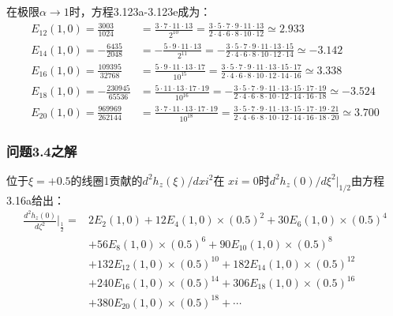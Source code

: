 在极限$\alpha\rightarrow 1$时，方程3.123a-3.123e成为：
\begin{subequations}
	\begin{align}
E_{12}(1,0)=\frac{3003}{1024}&=\frac{3\cdot7\cdot11\cdot13}{2^{10}}=\frac{3\cdot5\cdot7\cdot9\cdot11\cdot13}{2\cdot4\cdot6\cdot8\cdot10\cdot12}\simeq 2.933\\
E_{14}(1,0)=-\frac{6435}{2048}&=-\frac{5\cdot9\cdot11\cdot13}{2^{11}}=-\frac{3\cdot5\cdot7\cdot9\cdot11\cdot13\cdot15}{2\cdot4\cdot6\cdot8\cdot10\cdot12\cdot14}\simeq-3.142\\
E_{16}(1,0)=\frac{109395}{32768}&=\frac{5\cdot9\cdot11\cdot13\cdot17}{10^{15}}=\frac{3\cdot5\cdot7\cdot9\cdot11\cdot13\cdot15\cdot17} {2\cdot4\cdot6\cdot8\cdot10\cdot12\cdot14\cdot16}\simeq 3.338\\
E_{18}(1,0)=-\frac{230945}{65536}&=\frac{5\cdot11\cdot13\cdot17\cdot19}{10^{16}}=-\frac{3\cdot5\cdot7\cdot9\cdot11\cdot13\cdot15\cdot17\cdot19} {2\cdot4\cdot6\cdot8\cdot10\cdot12\cdot14\cdot16\cdot18}\simeq-3.524\\
E_{20}(1,0)=\frac{969969}{262144}&=\frac{3\cdot7\cdot11\cdot13\cdot17\cdot19}{10^{18}}=\frac{3\cdot5\cdot7\cdot9\cdot11\cdot13\cdot15\cdot17\cdot19\cdot21} {2\cdot4\cdot6\cdot8\cdot10\cdot12\cdot14\cdot16\cdot18\cdot20}\simeq 3.700
\end{align}
\end{subequations}

\subsubsection{问题3.4之解}
位于$\xi=+0.5$的线圈1贡献的$d^2h_z(\xi)/dxi^2$在 $xi=0$时$d^2h_z(0)/d\xi^2|_{1/2}$由方程3.16a给出：
\begin{equation*}%
\begin{split}
\frac{d^2h_z(0)}{d\zeta^2}\big|_{\frac{1}{2}}=&2E_2(1,0)+12E_4(1,0)\times(0.5)^2+30E_6(1,0)\times(0.5)^4\\
&+56E_8(1,0)\times(0.5)^6+90E_{10}(1,0)\times(0.5)^8\\
&+132E_{12}(1,0)\times(0.5)^{10}+182E_{14}(1,0)\times(0.5)^{12}\\
&+240E_{16}(1,0)\times(0.5)^{14}+306E_{18}(1,0)\times(0.5)^{16}\\
&+380E_{20}(1,0)\times(0.5)^{18}+\cdots
\end{split}\tag{S4.1}
\end{equation*}

